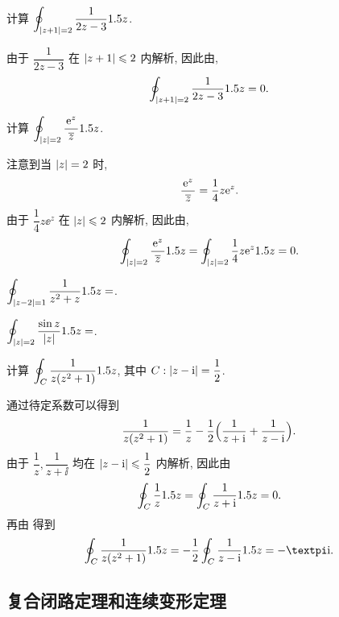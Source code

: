 \begin{example}
  计算 $\displaystyle\oint_{\lvert z+1\rvert=2}\frac1{2z-3}1.5 z$.
\end{example}

\begin{solution}
  由于 $\dfrac1{2z-3}$ 在 $\lvert z+1\rvert\leqslant 2$ 内解析,
  因此由\thmCG,
  \[
    \oint_{\lvert z+1\rvert=2}\frac1{2z-3}1.5 z=0.
  \]
\end{solution}

\begin{example}
  计算 $\displaystyle\oint_{\lvert z\rvert=2}\frac{\mathrm{e}^z}{~\overline z~}1.5 z$.
\end{example}

\begin{solution}
  注意到当 $\lvert z\rvert=2$ 时,
  \[
    \frac{\mathrm{e}^z}{~\overline z~}=\frac14{z\mathrm{e}^z}.
  \]
  由于 $\dfrac14z\ee^z$ 在 $\lvert z\rvert\leqslant 2$ 内解析,
  因此由\thmCG,
  \[
     \oint_{\lvert z\rvert=2}\frac{\mathrm{e}^z}{~\overline z~}1.5 z
    =\oint_{\lvert z\rvert=2}\frac14z\mathrm{e}^z1.5 z=0.
  \]
\end{solution}

\begin{exercise}\delspace
  \begin{enuminline}[(i)]
    \item $\displaystyle\oint_{\lvert z-2\rvert=1}\frac1{z^2+z}1.5 z=$\fillblank{}.
    \item $\displaystyle\oint_{\lvert z\rvert=2}\dfrac{\sin z}{\lvert z\rvert}1.5 z=$\fillblank{}.
  \end{enuminline}
\end{exercise}

\begin{example}
  计算 $\displaystyle\oint_C\frac1{z(z^2+1)}1.5 z$, 其中 $C:\lvert z-\mathrm{i}\rvert=\dfrac12$.
\end{example}

\begin{solution}
  通过待定系数可以得到
  \[
     \dfrac1{z(z^2+1)}
    =\dfrac1z-\dfrac12\Bigl(\dfrac1{z+\mathrm{i}}+\dfrac1{z-\mathrm{i} }\Bigr).
  \]
  由于 $\dfrac1z,\dfrac1{z+\ii}$ 均在 $\lvert z-\mathrm{i} \rvert\leqslant\dfrac12$ 内解析, 因此由\thmCG
  \[
    \oint_C \frac1z1.5 z
    =\oint_C \frac1{z+\mathrm{i}}1.5 z=0.
  \]
  再由 得到
  \[
    \oint_C \frac1{z(z^2+1)}\d z
    =-\half\oint_C \frac1{z-\ii }\d z=-\cpi\ii .
  \]
\end{solution}


\subsection{复合闭路定理和连续变形定理}

